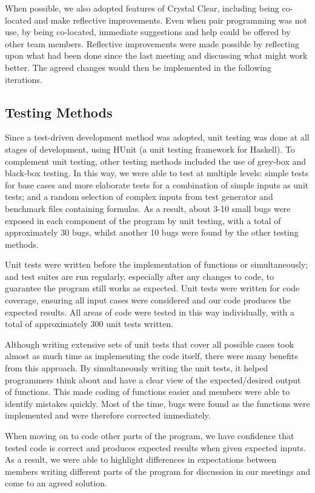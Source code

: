 When possible, we also adopted features of Crystal Clear, including being co-located and make reflective improvements. Even when pair programming was not use, by being co-located, immediate suggestions and help could be offered by other team members. Reflective improvements were made possible by reflecting upon what had been done since the last meeting and discussing what might work better. The agreed changes would then be implemented in the following iterations.

\subsection*{Testing Methods}

Since a test-driven development method was adopted, unit testing was done at all stages of development, using HUnit (a unit testing framework for Haskell). To complement unit testing, other testing methods included the use of grey-box and black-box testing. In this way, we were able to test at multiple levels: simple tests for base cases and more elaborate tests for a combination of simple inputs as unit tests; and a random selection of complex inputs from test generator and benchmark files containing formulas. As a result, about 3-10 small bugs were exposed in each component of the program by unit testing, with a total of approximately 30 bugs, whilst another 10 bugs were found by the other testing methods.

Unit tests were written before the implementation of functions or simultaneously; and test suites are run regularly, especially after any changes to code, to guarantee the program still works as expected. Unit tests were written for code coverage, ensuring all input cases were considered and our code produces the expected results. All areas of code were tested in this way individually, with a total of approximately 300 unit tests written.

Although writing extensive sets of unit tests that cover all possible cases took almost as much time as implementing the code itself, there were many benefits from this approach. By simultaneously writing the unit tests, it helped programmers think about and have a clear view of the expected/desired output of functions. This made coding of functions easier and members were able to identify mistakes quickly. Most of the time, bugs were found as the functions were implemented and were therefore corrected immediately.

When moving on to code other parts of the program, we have confidence that tested code is correct and produces expected results when given expected inputs. As a result, we were able to highlight differences in expectations between members writing different parts of the program for discussion in our meetings and come to an agreed solution.

